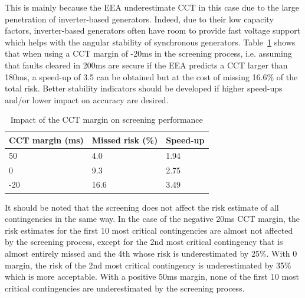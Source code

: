 This is mainly because the EEA underestimate CCT in this case due to the large penetration of inverter-based generators. Indeed, due to their low capacity factors, inverter-based generators often have room to provide fast voltage support which helps with the angular stability of synchronous generators. Table~\ref{tab:CCT_margin} shows that when using a CCT margin of -20ms in the screening process, i.e. assuming that faults cleared in 200ms are secure if the EEA predicts a CCT larger than 180ms, a speed-up of 3.5 can be obtained but at the cost of missing 16.6\% of the total risk. Better stability indicators should be developed if higher speed-ups and/or lower impact on accuracy are desired.

\begin{table}
  \centering
  \caption{Impact of the CCT margin on screening performance}
  \label{tab:CCT_margin}
  \begin{tabular}{@{}lll@{}}
  \toprule
  CCT margin (ms) & Missed risk (\%) & Speed-up \\ \midrule
  50  & 4.0  & 1.94 \\
  0   & 9.3  & 2.75 \\
  -20 & 16.6 & 3.49 \\ \bottomrule
  \end{tabular}
\end{table}

It should be noted that the screening does not affect the risk estimate of all contingencies in the same way. In the case of the negative 20ms CCT margin, the risk estimates for the first 10 most critical contingencies are almost not affected by the screening process, except for the 2nd most critical contingency that is almost entirely missed and the 4th whose risk is underestimated by 25\%. With 0 margin, the risk of the 2nd most critical contingency is underestimated by 35\% which is more acceptable. With a positive 50ms margin, none of the first 10 most critical contingencies are underestimated by the screening process.


